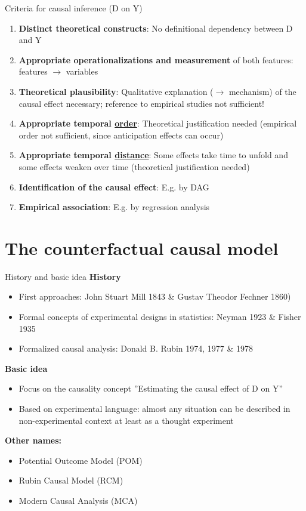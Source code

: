 \documentclass{beamer}\usepackage[]{graphicx}\usepackage[]{xcolor}
\begin{document}
\begin{frame}{Criteria for causal inference (D on Y)}
  \begin{enumerate} 
    \item \textbf{Distinct theoretical constructs}: No definitional dependency between D and Y
    \item \textbf{Appropriate operationalizations and measurement} of both features: features $\rightarrow$ variables
    \item \textbf{Theoretical plausibility}: Qualitative explanation ($\rightarrow$ mechanism) of the causal effect necessary; reference to empirical studies not sufficient!
    \item \textbf{Appropriate temporal \underline{order}}: Theoretical justification needed (empirical order not sufficient, since anticipation effects can occur)
    \item \textbf{Appropriate temporal \underline{distance}}: Some effects take time to unfold and some effects weaken over time (theoretical justification needed)
    \item \textbf{Identification of the causal effect}: E.g. by DAG
    \item \textbf{Empirical association}: E.g. by regression analysis
  \end{enumerate}
\end{frame}


\section{The counterfactual causal model} %


\begin{frame}{History and basic idea}
\textbf{History}
  \begin{itemize}
    \item First approaches: John Stuart Mill 1843 \& Gustav Theodor Fechner 1860)
    \item Formal concepts of experimental designs in statistics: Neyman 1923 \& Fisher 1935
    \item Formalized causal analysis: Donald B. Rubin 1974, 1977 \& 1978
  \end{itemize}
\textbf{Basic idea}  
  \begin{itemize}
    \item Focus on the causality concept ''Estimating the causal effect of D on Y''
    \item Based on experimental language: almost any situation can be described in non-experimental context at least as a thought experiment
  \end{itemize}  
\textbf{Other names:}  
  \begin{itemize}
    \item Potential Outcome Model (POM)
    \item Rubin Causal Model (RCM)
    \item Modern Causal Analysis (MCA)
  \end{itemize}   
\end{frame}
\end{document}
